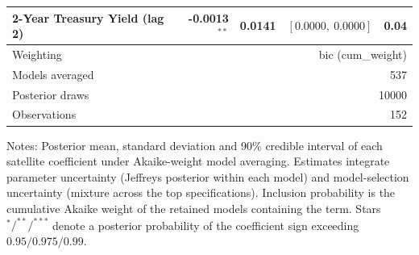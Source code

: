 \begin{table}[!htbp]
\begin{tabular}{lrrrr}
2-Year Treasury Yield (lag 2) & -0.0013$^{**}$ & 0.0141 & $[0.0000,\ 0.0000]$ & 0.04 \\
\midrule
Weighting & \multicolumn{4}{r}{bic (cum_weight)} \\
Models averaged & \multicolumn{4}{r}{537} \\
Posterior draws & \multicolumn{4}{r}{10000} \\
Observations & \multicolumn{4}{r}{152} \\
\bottomrule
\end{tabular}
\begin{tablenotes}\small
\item Notes: Posterior mean, standard deviation and 90\% credible interval of each satellite coefficient under Akaike-weight model averaging. Estimates integrate parameter uncertainty (Jeffreys posterior within each model) and model-selection uncertainty (mixture across the top specifications). Inclusion probability is the cumulative Akaike weight of the retained models containing the term. Stars $^{*}/^{**}/^{***}$ denote a posterior probability of the coefficient sign exceeding $0.95/0.975/0.99$.
\end{tablenotes}
\end{table}

